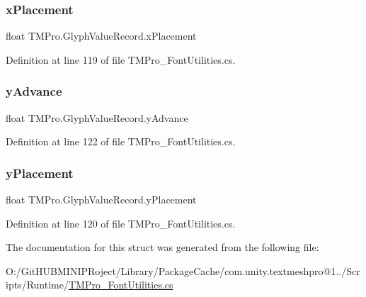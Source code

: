 \mbox{\label{struct_t_m_pro_1_1_glyph_value_record_afb4534930ae23f35c3f5d788a41d3b0d}} 
\subsubsection{\texorpdfstring{xPlacement}{xPlacement}}
{\footnotesize\ttfamily float T\+M\+Pro.\+Glyph\+Value\+Record.\+x\+Placement}



Definition at line 119 of file T\+M\+Pro\+\_\+\+Font\+Utilities.\+cs.

\mbox{\label{struct_t_m_pro_1_1_glyph_value_record_ae03fad907bb5a768820e58c02cbc28f6}} 
\subsubsection{\texorpdfstring{yAdvance}{yAdvance}}
{\footnotesize\ttfamily float T\+M\+Pro.\+Glyph\+Value\+Record.\+y\+Advance}



Definition at line 122 of file T\+M\+Pro\+\_\+\+Font\+Utilities.\+cs.

\mbox{\label{struct_t_m_pro_1_1_glyph_value_record_aab66b2d9351d8e799ea4e8250efc3366}} 
\subsubsection{\texorpdfstring{yPlacement}{yPlacement}}
{\footnotesize\ttfamily float T\+M\+Pro.\+Glyph\+Value\+Record.\+y\+Placement}



Definition at line 120 of file T\+M\+Pro\+\_\+\+Font\+Utilities.\+cs.



The documentation for this struct was generated from the following file\+:\begin{DoxyCompactItemize}
\item 
O\+:/\+Git\+H\+U\+B\+M\+I\+N\+I\+P\+Roject/\+Library/\+Package\+Cache/com.\+unity.\+textmeshpro@1../\+Scripts/\+Runtime/\mbox{\hyperlink{_t_m_pro___font_utilities_8cs}{T\+M\+Pro\+\_\+\+Font\+Utilities.\+cs}}\end{DoxyCompactItemize}

